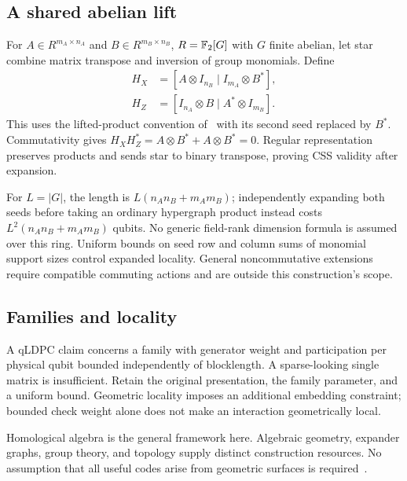 \subsection{A shared abelian lift}
For $A\in R^{m_A\times n_A}$ and $B\in R^{m_B\times n_B}$,
$R=\mathbb{F}_2[G]$ with $G$ finite abelian, let star combine matrix transpose
and inversion of group monomials. Define
\begin{align}
 H_X&=[A\otimes I_{n_B}\mid I_{m_A}\otimes B^*],\\
 H_Z&=[I_{n_A}\otimes B\mid A^*\otimes I_{m_B}].
\end{align}
This uses the lifted-product convention of~\cite[Section III-D]{panteleev2021}
with its second seed replaced by $B^*$. Commutativity gives
$H_XH_Z^*=A\otimes B^*+A\otimes B^*=0$. Regular representation
preserves products and sends star to binary transpose, proving CSS
validity after expansion.

For $L=|G|$, the length is $L(n_An_B+m_Am_B)$; independently expanding
both seeds before taking an ordinary hypergraph product instead costs
$L^2(n_An_B+m_Am_B)$ qubits. No generic field-rank dimension formula is
assumed over this ring. Uniform bounds on seed row and column sums of
monomial support sizes control expanded locality. General noncommutative
extensions require compatible commuting actions and are outside this
construction's scope.

\subsection{Families and locality}
A qLDPC claim concerns a family with generator weight and participation
per physical qubit bounded independently of blocklength. A sparse-looking
single matrix is insufficient. Retain the original presentation, the
family parameter, and a uniform bound. Geometric locality imposes an
additional embedding constraint; bounded check weight alone does not
make an interaction geometrically local.

Homological algebra is the general framework here. Algebraic geometry,
expander graphs, group theory, and topology supply distinct construction
resources. No assumption that all useful codes arise from geometric
surfaces is required~\cite{breuckmann2021}.
